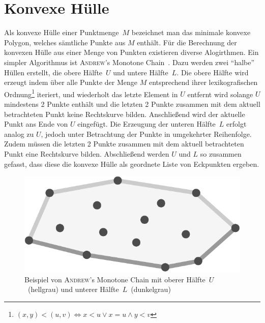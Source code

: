 \section{Konvexe Hülle}
\writtenby{\dcauthornameewie}%
Als konvexe Hülle einer Punktmenge~$M$ bezeichnet man das minimale konvexe Polygon, welches sämtliche Punkte aus $M$ enthält.
Für die Berechnung der konvexen Hülle aus einer Menge von Punkten existieren diverse Alogirthmen.
Ein simpler Algorithmus ist \textsc{Andrew}'s Monotone Chain~\cite[6--7]{compgeom2008}.
Dazu werden zwei "`halbe"' Hüllen erstellt, die obere Hälfte~$U$ und untere Hälfte~$L$.
Die obere Hälfte wird erzeugt indem über alle Punkte der Menge $M$ entsprechend ihrer lexikografischen Ordnung\footnote{
  \( (x,y) < (u, v) \Longleftrightarrow x < u \vee x = u \wedge y < v \)
} iteriert, und wiederholt das letzte Element in $U$ entfernt wird solange $U$ mindestens 2 Punkte enthält und die letzten 2 Punkte zusammen mit dem aktuell betrachteten Punkt keine Rechtskurve bilden.
Anschließend wird der aktuelle Punkt ans Ende von $U$ eingefügt.
Die Erzeugung der unteren Hälfte~$L$ erfolgt analog zu $U$, jedoch unter Betrachtung der Punkte in umgekehrter Reihenfolge.
Zudem müssen die letzten 2 Punkte zusammen mit dem aktuell betrachteten Punkt eine Rechtskurve bilden.
Abschließend werden $U$ und $L$ so zusammen gefasst, dass diese die konvexe Hülle als geordnete Liste von Eckpunkten ergeben.

\begin{figure}[H]
  \centering
  \includegraphics[width=0.5\columnwidth]{img/basics/convex-hull/andrews-monotone-chain}
  \caption[\textsc{Andrew}'s Monotone Chain]{Beispiel von \textsc{Andrew}'s Monotone Chain mit oberer Hälfte~$U$~(hellgrau) und unterer Hälfte~$L$~(dunkelgrau)}
\end{figure}

